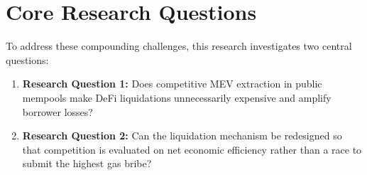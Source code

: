 \section{Core Research Questions}
To address these compounding challenges, this research investigates two central questions:
\begin{enumerate}
    \item \textbf{Research Question 1:} Does competitive MEV extraction in public mempools make DeFi liquidations unnecessarily expensive and amplify borrower losses?
    \item \textbf{Research Question 2:} Can the liquidation mechanism be redesigned so that competition is evaluated on net economic efficiency rather than a race to submit the highest gas bribe?
\end{enumerate}
